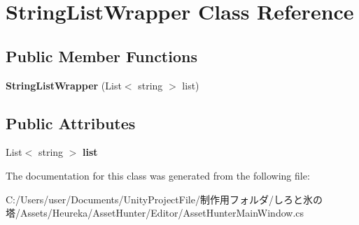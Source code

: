 \hypertarget{class_string_list_wrapper}{}\section{String\+List\+Wrapper Class Reference}
\label{class_string_list_wrapper}
\subsection*{Public Member Functions}
\begin{DoxyCompactItemize}
\item 
\mbox{\label{class_string_list_wrapper_abe9c00020d21e2c14c2ebd7d636fca1e}} 
{\bfseries String\+List\+Wrapper} (List$<$ string $>$ list)
\end{DoxyCompactItemize}
\subsection*{Public Attributes}
\begin{DoxyCompactItemize}
\item 
\mbox{\label{class_string_list_wrapper_aadb6b13d9607ffd4923959d37b26b46b}} 
List$<$ string $>$ {\bfseries list}
\end{DoxyCompactItemize}


The documentation for this class was generated from the following file\+:\begin{DoxyCompactItemize}
\item 
C\+:/\+Users/user/\+Documents/\+Unity\+Project\+File/制作用フォルダ/しろと氷の塔/\+Assets/\+Heureka/\+Asset\+Hunter/\+Editor/Asset\+Hunter\+Main\+Window.\+cs\end{DoxyCompactItemize}
